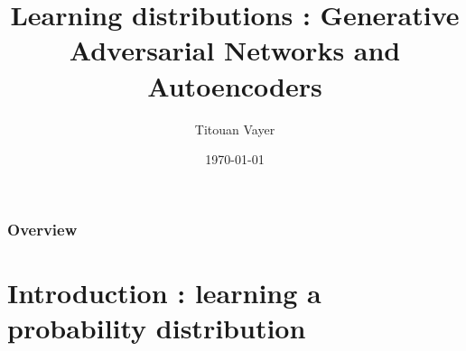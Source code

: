 \documentclass[french,9pt]{beamer}
\title[GAN's]{Learning distributions : Generative Adversarial Networks and Autoencoders} %
\author{Titouan Vayer} %
\date{\today} %
\begin{document}

\begin{frame}
\titlepage %
\end{frame}

\begin{frame}
\frametitle{Overview} %
  \tableofcontents
\end{frame}

\section{Introduction : learning a probability distribution}
\end{document}
